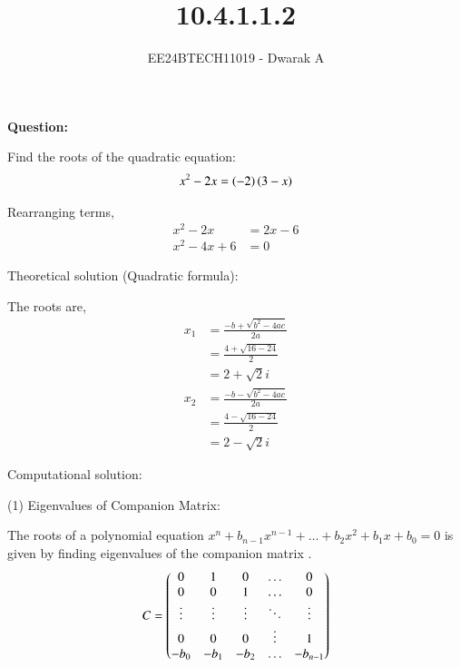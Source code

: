 \documentclass[journal]{IEEEtran}
\begin{document}

\vspace{3cm}

\title{10.4.1.1.2}
\author{EE24BTECH11019 - Dwarak A}
{\let\newpage\relax\maketitle}

\renewcommand{\thefigure}{\theenumi}
\renewcommand{\thetable}{\theenumi}
\setlength{\intextsep}{10pt} %


\renewcommand{\thetable}{\theenumi}

\textbf{Question:}

Find the roots of the quadratic equation:
\begin{align}
    x^2 - 2x = \left(-2\right)\left(3-x\right)
\end{align}

\solution

Rearranging terms,
\begin{align}
    x^2 - 2x &= 2x - 6 \\
    x^2 - 4x + 6 &= 0
\end{align}

Theoretical solution (Quadratic formula):

The roots are,
\begin{align}
    x_1 &= \frac{-b+\sqrt{b^2 - 4ac}}{2a} \\
    &= \frac{4+\sqrt{16-24}}{2} \\
    &= 2+\sqrt{2}i \\
    x_2 &= \frac{-b-\sqrt{b^2 - 4ac}}{2a} \\
    &= \frac{4-\sqrt{16-24}}{2} \\
    &= 2-\sqrt{2}i
\end{align}

Computational solution:

(1) Eigenvalues of Companion Matrix:

The roots of a polynomial equation $x^n+b_{n-1}x^{n-1}+\dots+b_2x^2+b_1x+b_0 = 0$ is given by finding eigenvalues of the companion matrix .
\begin{align}
    C = \begin{pmatrix}0&1&0&\dots&0\\ 0&0&1&\dots&0\\ \vdots &\vdots &\vdots &\ddots&\vdots\\0&0&0&\vdots&1\\-b_0&-b_1&-b_2&\dots&-b_{n-1}\end{pmatrix}
\end{align}
\end{document}

